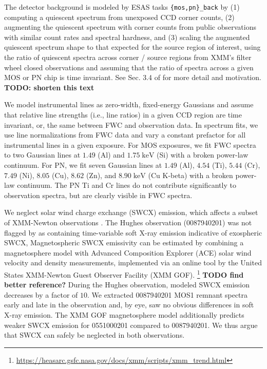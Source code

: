 \documentclass[preprint2,tighten,trackchanges]{aastex6}
\newcommand*{\mt}{\mathrm}
\newcommand*{\unit}[1]{\;\mt{#1}}  %
\begin{document}
The detector background is modeled by ESAS tasks \texttt{\{mos,pn\}\_back}
by (1) computing a quiescent spectrum from unexposed CCD corner counts,
(2) augmenting the quiescent spectrum with corner counts from public
observations with similar count rates and spectral hardness, and (3) scaling
the augmented quiescent spectrum shape to that expected for the source region
of interest, using the ratio of quiescent spectra across corner / source
regions from XMM's filter wheel closed observations and assuming that the ratio
of spectra across a given MOS or PN chip is time invariant.
See Sec. 3.4 of \citet{kuntz2008} for more detail and motivation.
\textbf{TODO: shorten this text}

We model instrumental lines as zero-width, fixed-energy Gaussians and assume
that relative line strengths (i.e., line ratios) in a given CCD region are time
invariant, or, the same between FWC and observation data.
In spectrum fits, we use line normalizations from FWC data and vary a constant
prefactor for all instrumental lines in a given exposure.
For MOS exposures, we fit FWC spectra to two Gaussian lines at $1.49$ (Al) and
$1.75 \unit{keV}$ (Si) with a broken power-law continuum.
For PN, we fit seven Gaussian lines at $1.49$ (Al), $4.54$ (Ti), $5.44$ (Cr),
$7.49$ (Ni), $8.05$ (Cu), $8.62$ (Zn), and $8.90 \unit{keV}$ (Cu K-beta) with a
broken power-law continuum.
The PN Ti and Cr lines do not contribute significantly to observation spectra,
but are clearly visible in FWC spectra.

We neglect solar wind charge exchange (SWCX) emission, which affects a subset
of XMM-Newton observations \citep{snowden2004}.
The Hughes observation (0087940201) was not flagged by \citet{carter2011} as
containing time-variable soft X-ray emission indicative of exospheric SWCX,
Magnetospheric SWCX emissivity can be estimated by combining a magnetosphere
model \citep{spreiter1966} with Advanced Composition Explorer (ACE) solar wind
velocity and density measurements, implemented via an online tool by the United
States XMM-Newton Guest Observer Facility (XMM GOF).
\footnote{\href{https://heasarc.gsfc.nasa.gov/docs/xmm/scripts/xmm_trend.html}{https://heasarc.gsfc.nasa.gov/docs/xmm/scripts/xmm\_trend.html}}
\textbf{TODO find better reference?}  %
During the Hughes observation, modeled SWCX emission decreases by a
factor of $10$.
We extracted 0087940201 MOS1 remnant spectra early and late in the observation
and, by eye, saw no obvious differences in soft X-ray emission.
The XMM GOF magnetosphere model additionally predicts weaker SWCX emission for
0551000201 compared to 0087940201.
We thus argue that SWCX can safely be neglected in both observations.
\end{document}
